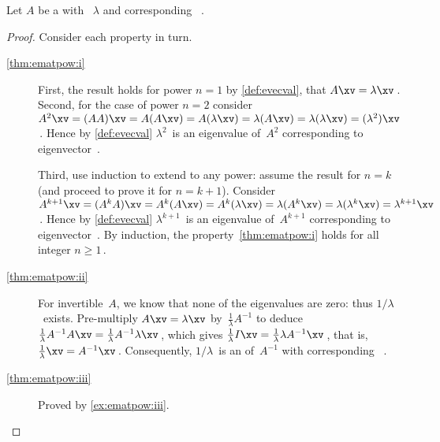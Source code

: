 \begin{theorem} \label{thm:ematpow} 
Let \(A\) be a  with ~\(\lambda\) and corresponding ~\xv.
\end{theorem}
\begin{proof} 
Consider each property in turn.
\begin{description}
\item[\ref{thm:ematpow:i}]  
First, the result holds for power \(n=1\) by \cref{def:evecval}, that \(A\xv=\lambda\xv\)\,.
Second, for the case of power \(n=2\)  consider \(A^2\xv=(AA)\xv=A(A\xv)=A(\lambda\xv)=\lambda(A\xv)=\lambda(\lambda\xv)=(\lambda^2)\xv\)\,.  
Hence by \cref{def:evecval} \(\lambda^2\)~is an eigenvalue of~\(A^2\) corresponding to eigenvector~\xv.

Third, use induction to extend to any power: assume the result for \(n=k\) (and proceed to prove it for \(n=k+1\)).
Consider \(A^{k+1}\xv=(A^kA)\xv=A^k(A\xv)=A^k(\lambda\xv)=\lambda(A^k\xv)=\lambda(\lambda^k\xv)=\lambda^{k+1}\xv\)\,.
Hence by \cref{def:evecval} \(\lambda^{k+1}\)~is an eigenvalue of~\(A^{k+1}\) corresponding to eigenvector~\xv.
By induction, the property~\ref{thm:ematpow:i} holds for all integer \(n\geq1\)\,.

\item[\ref{thm:ematpow:ii}]  
For invertible~\(A\), we know that none of the eigenvalues are zero: thus \(1/\lambda\)~exists.
Pre-multiply \(A\xv=\lambda\xv\) by~\(\frac1\lambda A^{-1}\) to deduce
\(\frac1\lambda A^{-1}A\xv=\frac1\lambda A^{-1}\lambda\xv\)\,, which gives \(\frac1\lambda I\xv=\frac1\lambda \lambda A^{-1}\xv\)\,, that is, \(\frac1\lambda\xv= A^{-1}\xv\)\,.  
Consequently, \(1/\lambda\)~is an  of~\(A^{-1}\) with corresponding ~\xv.

\item[\ref{thm:ematpow:iii}] Proved by \cref{ex:ematpow:iii}.  
\end{description}
\end{proof}



